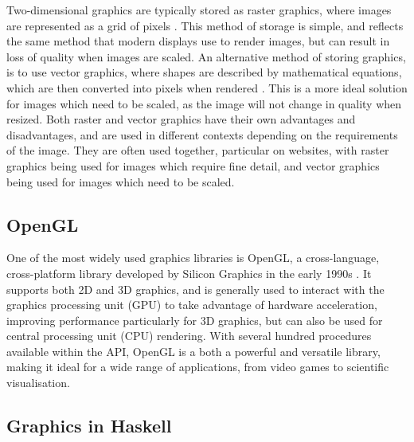 \documentclass[../main.tex]{subfiles}
\begin{document}
        Two-dimensional graphics are typically stored as raster graphics, where images
            are represented as a grid of pixels \citep{rasterGraphics}.
        This method of storage is simple, and reflects the same method that modern
            displays use to render images, but can result in loss of quality when images
            are scaled.
        An alternative method of storing graphics, is to use vector graphics, where
            shapes are described by mathematical equations, which are then converted into
            pixels when rendered \citep{vectorGraphics}.
        This is a more ideal solution for images which need to be scaled, as the image
            will not change in quality when resized.
        Both raster and vector graphics have their own advantages and disadvantages,
            and are used in different contexts depending on the requirements of the image.
        They are often used together, particular on websites, with raster graphics
            being used for images which require fine detail, and vector graphics being used
            for images which need to be scaled.

        \subsection{OpenGL}
            One of the most widely used graphics libraries is OpenGL, a cross-language,
                cross-platform library developed by Silicon Graphics in the early 1990s
                \citep{openGL}.
            It supports both 2D and 3D graphics, and is generally used to interact with the
                graphics processing unit (GPU) to take advantage of hardware acceleration,
                improving performance particularly for 3D graphics, but can also be used for
                central processing unit (CPU) rendering.
            With several hundred procedures available within the API, OpenGL is a both a
                powerful and versatile library, making it ideal for a wide range of
                applications, from video games to scientific visualisation.

        \subsection{Graphics in Haskell}
\end{document}
